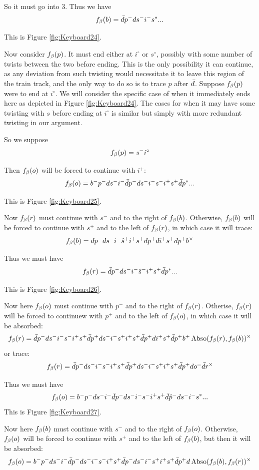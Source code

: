 So it must go into 3. Thus we have
\[
f_\beta(b) = \bar{d} p^- d s^- i^- s^*...
\]

This is Figure \ref{fig:Keyboard24}.

Now consider $f_\beta(p)$. It must end either at $i^\circ$ or $s^\circ$, possibly with some number of twists between the two before ending. This is the only possibility it can continue, as any deviation from such twisting would necessitate it to leave this region of the train track, and the only way to do so is to trace $p$ after $\bar{d}$. Suppose $f_\beta(p)$ were to end at $i^\circ$. We will consider the specific case of when it immediately ends here as  depicted in Figure \ref{fig:Keyboard24}. The cases for when it may have some twisting with $s$ before ending at $i^\circ$ is similar but simply with more redundant twisting in our argument.

So we suppose
\[
f_\beta(p) = s^- i^\circ
\]

Then $f_\beta(o)$ will be forced to continue with $i^+$:
\[
f_\beta(o) = b^- p^- d s^- i^- \bar{d} p^- d s^- i^- s^- i^+ s^+ \bar{d} p^*...
\]

This is Figure \ref{fig:Keyboard25}.

Now $f_\beta(r)$ must continue with $s^-$ and to the right of $f_\beta(b)$. Otherwise, $f_\beta(b)$ will be forced to continue with $s^+$ and to the left of $f_\beta(r)$, in which case it will trace:
\[
f_\beta(b) = \bar{d} p^- d s^- i^- \hat{s}^+ i^+ s^+ \bar{d} p^+ d i^+ s^+ \bar{d} p^+ b^\times
\]

Thus we must have
\[
f_\beta(r) = \bar{d} p^- d s^- i^- \hat{s}^- i^+ s^+ \bar{d} p^*...
\]

This is Figure \ref{fig:Keyboard26}.



Now here $f_\beta(o)$ must continue with $p^-$ and to the right of $f_\beta(r)$. Otherise, $f_\beta(r)$ will be forced to continuew with $p^+$ and to the left of $f_\beta(o)$, in which case it will be absorbed:
\[
f_\beta(r) = \bar{d} p^- d s^- i^- s^- i^+ s^+ \bar{d} p^+ d s^- i^- s^+ i^+ s^+ \bar{d} p^+ d i^+ s^+ \bar{d} p^+ b^+ \operatorname{Abso}(f_\beta(r), f_\beta(b))^\times
\]
or trace:
\[
f_\beta(r) = \bar{d} p^- d s^- i^- s^- i^+ s^+ \bar{d} p^+ d s^- i^- s^+ i^+ s^+ \bar{d} p^+ d o^= \bar{d} r^\times
\]

Thus we must have
\[
f_\beta(o) = b^- p^- d s^- i^- \bar{d} p^- d s^- i^- s^- i^+ s^+ \bar{d} \hat{p}^- d s^- i^- s^*...
\]
This is Figure \ref{fig:Keyboard27}.

Now here $f_\beta(b)$ must continue with $s^-$ and to the right of $f_\beta(o)$. Otherwise, $f_\beta(o)$ will be forced to continue with $s^+$ and to the left of $f_\beta(b)$, but then it will be absorbed:
\[
f_\beta(o) = b^- p^- d s^- i^- \bar{d} p^- d s^- i^- s^- i^+ s^+ \bar{d} p^- d s^- i^- s^+ i^+ s^+ \bar{d} p^+ d \operatorname{Abso}(f_\beta(b), f_\beta(r))^\times
\]


